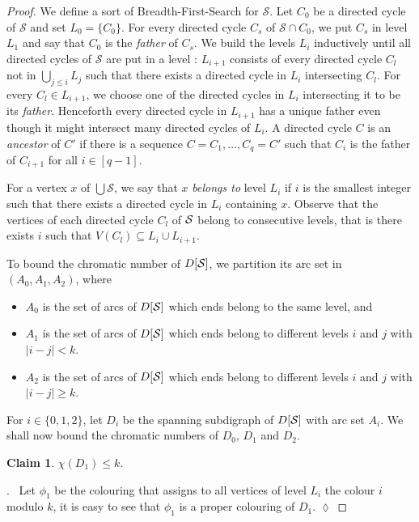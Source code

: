 \documentclass[utf8,10pt]{article}
\theoremstyle{plain}
\newtheorem{claim}{Claim}[theorem]
\theoremstyle{definition}
\theoremstyle{remark}
\newenvironment{subproof}{\par\noindent {\it Subproof}.\ }{\hfill$\lozenge$\par\vspace{11pt}}
\begin{document}
\begin{proof}
We define a sort of Breadth-First-Search for $\mathcal{S}$.
Let $C_0$ be a directed cycle of $\mathcal{S}$ and set $L_0 = \{C_0\}$. For every directed cycle $C_s$ of $\mathcal{S}\cap C_0$, we put $C_s$ in level $L_1$ and say that $C_0$ is the \textit{father} of $C_s$. We build  the levels $L_i$ inductively
until all directed cycles of $\mathcal{S}$ are put in a level : $L_{i+1}$ consists of every directed cycle $C_l$ not in $\bigcup_{j \leq i} L_j$ such that 
there exists a directed cycle in $L_i$ intersecting $C_l$.  For every $C_l\in L_{i+1}$, we choose one of the directed cycles in $L_{i}$ intersecting it to be its {\it  father}. Henceforth every directed cycle in $L_{i+1}$ has a unique  father even though it might intersect many directed cycles of $L_i$.
A directed cycle $C$ is an {\it ancestor} of $C'$ if there is a sequence $C=C_1, \dots , C_q=C'$ such that $C_i$ is the father of $C_{i+1}$ for all $i\in [q-1]$.

For a vertex $x$ of $\bigcup \mathcal{S}$, we say that $x$ \textit{belongs to} level $L_i$ if
$i$ is the smallest integer such that there exists a directed cycle in $L_i$ containing $x$. Observe that the vertices of each directed cycle $C_l$ of ${\cal S}$ belong to consecutive levels, that is there exists $i$ such that $V(C_l)\subseteq L_i\cup L_{i+1}$.




To bound  the chromatic number of $D[{\cal S}]$, we partition its arc set in $(A_0,A_1, A_2)$, where
\begin{itemize}
	\item $A_0$ is the set of arcs of $D[{\cal S}]$ which ends belong to the same level, and
	\item $A_1$ is the set of arcs of $D[{\cal S}]$ which ends belong to different levels $i$ and $j$ with $ | i - j| < k$.	
	\item $A_2$ is the set of arcs of $D[{\cal S}]$ which ends belong to different levels $i$ and $j$ with $ | i - j| \geq k$.
\end{itemize} 

For $i\in \{0,1,2\}$, let $D_i$ be the spanning subdigraph of $D[{\cal S}]$ with arc set $A_i$.
We shall now bound the chromatic numbers of $D_0$, $D_1$ and  $D_2$.


\begin{claim}\label{claim:D1}
$\chi(D_1)\leq k$.
\end{claim}

\begin{subproof}
Let $\phi_1$ be the colouring that assigns to all vertices of level $L_i$ the colour $i$ modulo $k$, it 
is easy to see that $\phi_1$ is a proper colouring of $D_1$.
\end{subproof}







\end{proof}
\end{document}
